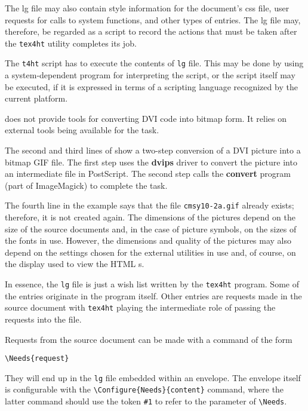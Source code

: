 The lg file may also contain style information for the document's css
file, user requests for calls to system functions, and other types of
entries. The lg file may, therefore, be regarded as a script to record
the actions that must be taken after the \verb|tex4ht| utility completes
its job. 

The \verb|t4ht| script has to execute the contents of \verb|lg| file.
This may be done by using a system-dependent program for interpreting
the script, or the script itself may be executed, if it is expressed in
terms of a scripting language recognized by the current platform. 


\texht does not provide tools for converting DVI code into bitmap form. It relies 
on external tools being available for the task. 

The second and third lines of  show a two-step conversion of
a DVI picture into a bitmap GIF file. The first step uses the
\textbf{dvips}  driver to convert the picture into an intermediate file
in PostScript. The second step calls the \textbf{convert} program (part
of ImageMagick) to complete the task. 

The fourth line in the example says that the file \verb|cmsy10-2a.gif| already exists; 
therefore, it is not created again. 
The dimensions of the pictures depend on the size of the source documents 
and, in the case of picture symbols, on the sizes of the fonts in use. However, the 
dimensions and quality of the pictures may also depend on the settings chosen for 
the external utilities in use and, of course, on the display used to view the HTML 
s. 


In essence, the \verb|lg| file is just a wish list written by the
\verb|tex4ht| program. Some of the entries originate in the program
itself. Other entries are requests made in the source document with
\verb|tex4ht| playing the intermediate role of passing the requests into
the file. 

Requests from the source document can be made with a command of the form 

\begin{verbatim}
\Needs{request} 
\end{verbatim}

They will end up in the \verb|lg| file embedded within an envelope. The envelope itself 
is configurable with the \verb|\Configure{Needs}{content}| command, where the latter 
command should use the token \verb|#1| to refer to the parameter of \verb|\Needs|. 

